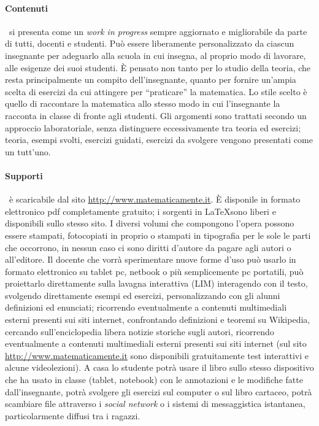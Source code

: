 \paragraph{Contenuti} \serie\ si presenta come un \textit{work in progress} sempre aggiornato e migliorabile da parte
di tutti, docenti e studenti. Può essere liberamente personalizzato da ciascun insegnante per adeguarlo alla
scuola in cui insegna, al proprio modo di lavorare, alle esigenze dei suoi studenti. È pensato non tanto per lo
studio della teoria, che resta principalmente un compito dell'insegnante, quanto per fornire un'ampia scelta di
esercizi da cui attingere per ``praticare'' la matematica. Lo stile scelto è quello di raccontare la matematica
allo stesso modo in cui l'insegnante la racconta in classe di fronte agli studenti. Gli
argomenti sono trattati secondo un approccio laboratoriale, senza distinguere eccessivamente tra teoria ed
esercizi; teoria, esempi svolti, esercizi guidati, esercizi da svolgere vengono presentati come un tutt'uno.

\paragraph{Supporti}
\serie\ è scaricabile dal sito \url{http://www.matematicamente.it}. \`E disponile in formato elettronico
pdf completamente gratuito; i sorgenti in \LaTeX sono liberi e disponibili sullo stesso sito. I diversi volumi che compongono l'opera
possono essere stampati, fotocopiati in proprio o stampati in tipografia per le sole le parti che occorrono, in
nessun caso ci sono diritti d'autore da pagare agli autori o all'editore. Il docente che vorrà sperimentare
nuove forme d'uso può usarlo in formato elettronico su tablet pc, netbook o più semplicemente pc portatili,
può proiettarlo direttamente sulla lavagna interattiva (LIM) interagendo con il testo, svolgendo direttamente
esempi ed esercizi, personalizzando con gli alunni definizioni ed enunciati; ricorrendo eventualmente a
contenuti multimediali esterni presenti sui siti internet, confrontando definizioni e teoremi su Wikipedia,
cercando sull'enciclopedia libera notizie storiche sugli autori, ricorrendo eventualmente a contenuti multimediali
esterni presenti sui siti internet (sul sito \url{http://www.matematicamente.it} sono disponibili gratuitamente test interattivi
e alcune videolezioni). A casa lo studente potrà usare il libro sullo
stesso dispositivo che ha usato in classe (tablet, notebook) con le annotazioni e le modifiche fatte
dall'insegnante, potrà svolgere gli esercizi sul computer o sul libro cartaceo, potrà scambiare file attraverso i \textit{social network}
o i sistemi di messaggistica istantanea, particolarmente diffusi tra i ragazzi.

